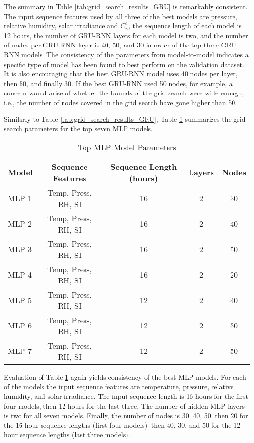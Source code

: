 The summary in Table \ref{tab:grid_search_results_GRU} is remarkably consistent. The input sequence features used by all three of the best models are pressure, relative humidity, solar irradiance and $C_{n}^{2}$, the sequence length of each model is 12 hours, the number of \ac{GRU-RNN} layers for each model is two, and the number of nodes per \ac{GRU-RNN} layer is 40, 50, and 30 in order of the top three \ac{GRU-RNN} models. The consistency of the parameters from model-to-model indicates a specific type of model has been found to best perform on the validation dataset. It is also encouraging that the best \ac{GRU-RNN} model uses 40 nodes per layer, then 50, and finally 30. If the best \ac{GRU-RNN} used 50 nodes, for example, a concern would arise of whether the bounds of the grid search were wide enough, i.e., the number of nodes covered in the grid search have gone higher than 50.

Similarly to Table \ref{tab:grid_search_results_GRU}, Table \ref{tab:grid_search_results_MLP} summarizes the grid search parameters for the top seven \ac{MLP} models.
\begin{table}[h!]
	\begin{center}
		\caption{Top MLP Model Parameters}
		\label{tab:grid_search_results_MLP}
		\begin{tabular}{||l|c|c|c|c||}
			\hline
			Model & Sequence Features & Sequence Length (hours) & Layers & Nodes \\
			\hline
			\hline
			MLP 1 & Temp, Press, RH, SI & 16 & 2 & 30 \\
			\hline
			MLP 2 & Temp, Press, RH, SI & 16 & 2 & 40 \\
			\hline
			MLP 3 & Temp, Press, RH, SI & 16 & 2 & 50 \\
			\hline
			MLP 4 & Temp, Press, RH, SI & 16 & 2 & 20 \\
			\hline
			MLP 5 & Temp, Press, RH, SI & 12 & 2 & 40 \\
			\hline
			MLP 6 & Temp, Press, RH, SI & 12 & 2 & 30 \\
			\hline
			MLP 7 & Temp, Press, RH, SI & 12 & 2 & 50 \\
			\hline
		\end{tabular}
	\end{center}
\end{table}
Evaluation of Table \ref{tab:grid_search_results_MLP} again yields consistency of the best \ac{MLP} models. For each of the models the input sequence features are temperature, pressure, relative humidity, and solar irradiance. The input sequence length is 16 hours for the first four models, then 12 hours for the last three. The number of hidden \ac{MLP} layers is two for all seven models. Finally, the number of nodes is 30, 40, 50, then 20 for the 16 hour sequence lengths (first four models), then 40, 30, and 50 for the 12 hour sequence lengths (last three models).

